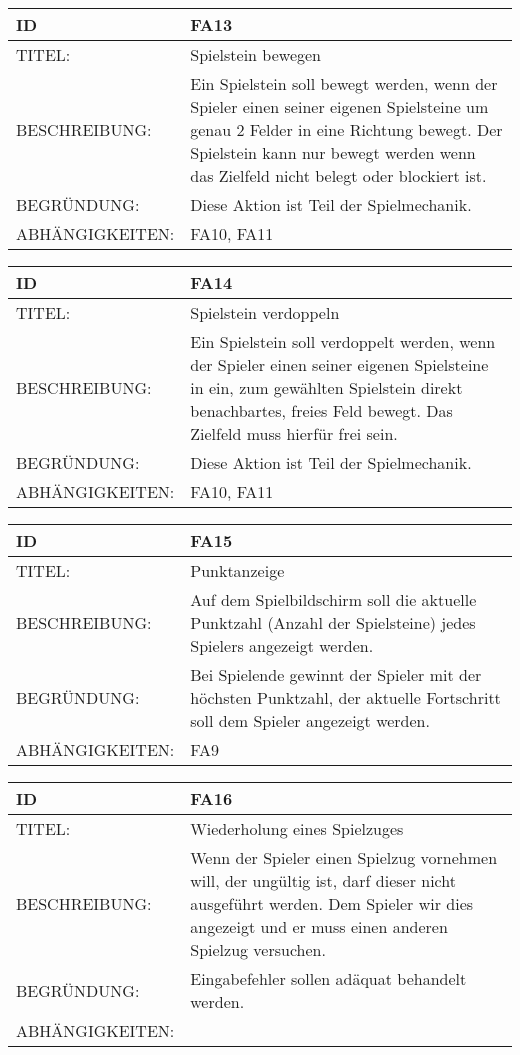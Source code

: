 \documentclass{uulm-assignment}
\begin{document}
\begin{tabularx}{16cm}{l|X}
\textbf{ID} & \textbf{FA13} \\
\hline
TITEL: & Spielstein bewegen \\
\hline
BESCHREIBUNG: & Ein Spielstein soll bewegt werden, wenn der Spieler einen seiner eigenen Spielsteine um genau 2 Felder in eine Richtung bewegt. Der Spielstein kann nur bewegt werden wenn das Zielfeld nicht belegt oder blockiert ist.
\\
\hline
BEGRÜNDUNG: & Diese Aktion ist Teil der Spielmechanik. \\
\hline
ABHÄNGIGKEITEN: & FA10, FA11\\
\end{tabularx}

\begin{tabularx}{16cm}{l|X}
\textbf{ID} & \textbf{FA14} \\
\hline
TITEL: & Spielstein verdoppeln \\
\hline
BESCHREIBUNG: & Ein Spielstein soll verdoppelt werden, wenn der Spieler einen seiner eigenen Spielsteine in ein, zum gewählten Spielstein direkt benachbartes, freies Feld bewegt.
Das Zielfeld muss hierfür frei sein.
\\
\hline
BEGRÜNDUNG: & Diese Aktion ist Teil der Spielmechanik. \\
\hline
ABHÄNGIGKEITEN: & FA10, FA11 \\
\end{tabularx}

\begin{tabularx}{16cm}{l|X}
\textbf{ID} & \textbf{FA15} \\
\hline
TITEL: & Punktanzeige\\
\hline
BESCHREIBUNG: & Auf dem Spielbildschirm soll die aktuelle Punktzahl (Anzahl der Spielsteine) jedes
Spielers angezeigt werden.
\\
\hline
BEGRÜNDUNG: & Bei Spielende gewinnt der Spieler mit der höchsten Punktzahl, der aktuelle Fortschritt soll dem Spieler angezeigt werden.\\
\hline
ABHÄNGIGKEITEN: & FA9 \\
\end{tabularx}

\begin{tabularx}{16cm}{l|X}
\textbf{ID} & \textbf{FA16} \\
\hline
TITEL: & Wiederholung eines Spielzuges\\
\hline
BESCHREIBUNG: & Wenn der Spieler einen Spielzug vornehmen will, der ungültig ist, darf dieser nicht ausgeführt werden.
Dem Spieler wir dies angezeigt und er muss einen anderen Spielzug versuchen.
\\
\hline
BEGRÜNDUNG: & Eingabefehler sollen adäquat behandelt werden. \\
\hline
ABHÄNGIGKEITEN: & \\
\end{tabularx}
\end{document}
